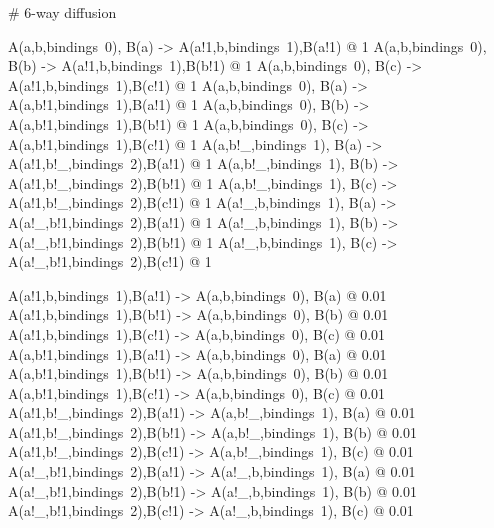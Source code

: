 \begin{kappasource}


# 6-way diffusion


A(a,b,bindings~0), B(a) -> A(a!1,b,bindings~1),B(a!1) @ 1
A(a,b,bindings~0), B(b) -> A(a!1,b,bindings~1),B(b!1) @ 1
A(a,b,bindings~0), B(c) -> A(a!1,b,bindings~1),B(c!1) @ 1
A(a,b,bindings~0), B(a) -> A(a,b!1,bindings~1),B(a!1) @ 1
A(a,b,bindings~0), B(b) -> A(a,b!1,bindings~1),B(b!1) @ 1
A(a,b,bindings~0), B(c) -> A(a,b!1,bindings~1),B(c!1) @ 1
A(a,b!_,bindings~1), B(a) -> A(a!1,b!_,bindings~2),B(a!1) @ 1
A(a,b!_,bindings~1), B(b) -> A(a!1,b!_,bindings~2),B(b!1) @ 1
A(a,b!_,bindings~1), B(c) -> A(a!1,b!_,bindings~2),B(c!1) @ 1
A(a!_,b,bindings~1), B(a) -> A(a!_,b!1,bindings~2),B(a!1) @ 1
A(a!_,b,bindings~1), B(b) -> A(a!_,b!1,bindings~2),B(b!1) @ 1
A(a!_,b,bindings~1), B(c) -> A(a!_,b!1,bindings~2),B(c!1) @ 1

A(a!1,b,bindings~1),B(a!1) -> A(a,b,bindings~0), B(a) @ 0.01
A(a!1,b,bindings~1),B(b!1) -> A(a,b,bindings~0), B(b) @ 0.01
A(a!1,b,bindings~1),B(c!1) -> A(a,b,bindings~0), B(c) @ 0.01
A(a,b!1,bindings~1),B(a!1) -> A(a,b,bindings~0), B(a) @ 0.01
A(a,b!1,bindings~1),B(b!1) -> A(a,b,bindings~0), B(b) @ 0.01
A(a,b!1,bindings~1),B(c!1) -> A(a,b,bindings~0), B(c) @ 0.01
A(a!1,b!_,bindings~2),B(a!1) -> A(a,b!_,bindings~1), B(a) @ 0.01
A(a!1,b!_,bindings~2),B(b!1) -> A(a,b!_,bindings~1), B(b) @ 0.01
A(a!1,b!_,bindings~2),B(c!1) -> A(a,b!_,bindings~1), B(c) @ 0.01
A(a!_,b!1,bindings~2),B(a!1) -> A(a!_,b,bindings~1), B(a) @ 0.01
A(a!_,b!1,bindings~2),B(b!1) -> A(a!_,b,bindings~1), B(b) @ 0.01
A(a!_,b!1,bindings~2),B(c!1) -> A(a!_,b,bindings~1), B(c) @ 0.01


\end{kappasource}

